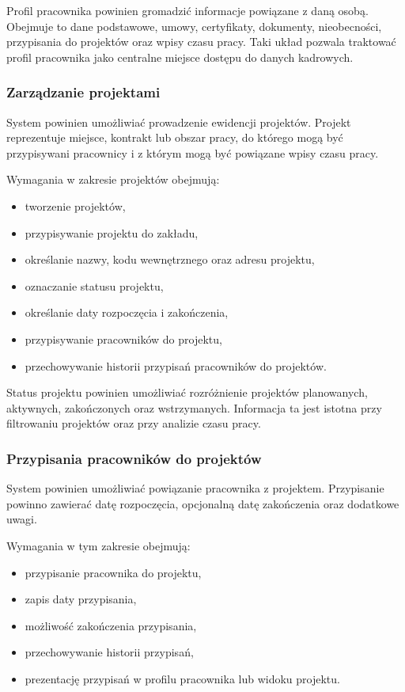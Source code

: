 Profil pracownika powinien gromadzić informacje powiązane z daną osobą. Obejmuje to dane podstawowe, umowy, certyfikaty, dokumenty, nieobecności, przypisania do projektów oraz wpisy czasu pracy. Taki układ pozwala traktować profil pracownika jako centralne miejsce dostępu do danych kadrowych.

\subsubsection{Zarządzanie projektami}

System powinien umożliwiać prowadzenie ewidencji projektów. Projekt reprezentuje miejsce, kontrakt lub obszar pracy, do którego mogą być przypisywani pracownicy i z którym mogą być powiązane wpisy czasu pracy.

Wymagania w zakresie projektów obejmują:
\begin{itemize}
    \item tworzenie projektów,
    \item przypisywanie projektu do zakładu,
    \item określanie nazwy, kodu wewnętrznego oraz adresu projektu,
    \item oznaczanie statusu projektu,
    \item określanie daty rozpoczęcia i zakończenia,
    \item przypisywanie pracowników do projektu,
    \item przechowywanie historii przypisań pracowników do projektów.
\end{itemize}

Status projektu powinien umożliwiać rozróżnienie projektów planowanych, aktywnych, zakończonych oraz wstrzymanych. Informacja ta jest istotna przy filtrowaniu projektów oraz przy analizie czasu pracy.

\subsubsection{Przypisania pracowników do projektów}

System powinien umożliwiać powiązanie pracownika z projektem. Przypisanie powinno zawierać datę rozpoczęcia, opcjonalną datę zakończenia oraz dodatkowe uwagi.

Wymagania w tym zakresie obejmują:
\begin{itemize}
    \item przypisanie pracownika do projektu,
    \item zapis daty przypisania,
    \item możliwość zakończenia przypisania,
    \item przechowywanie historii przypisań,
    \item prezentację przypisań w profilu pracownika lub widoku projektu.
\end{itemize}

